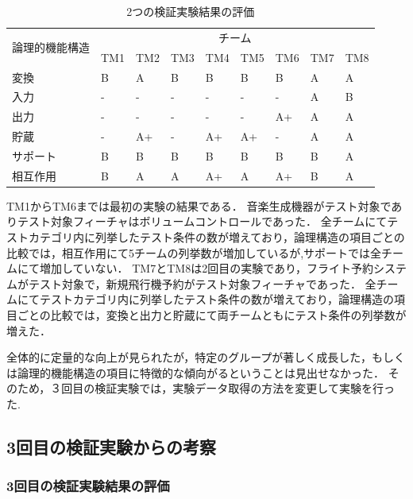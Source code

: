 \documentclass[10pt,a4j]{jarticle}
\begin{document}
\begin{table}[htbp]
\footnotesize
  \centering
  \caption{2つの検証実験結果の評価}
    \begin{tabular}{|l|l|l|l|l|l|l|l|l|}
    \hline
    \multicolumn{1}{|c|}{\multirow{2}[4]{*}{論理的機能構造}} & \multicolumn{8}{c|}{チーム} \bigstrut\\
\cline{2-9}          & TM1   & TM2   & TM3   & TM4   & TM5   & TM6 & TM7 & TM8 \bigstrut\\
    \hline
    変換  & B     & A     & B     & B     & B     & B & A     & A\bigstrut\\
    \hline
    入力 &  -     &   -     &   -    &   -    &   -    & -     & A     & B   \bigstrut\\
    \hline
    出力 & -     & -     & -     & -     & -     & A+ & A     & A \bigstrut\\
    \hline
    貯蔵 & -     & A+    & -     & A+    & A+    & -& A     & A  \bigstrut\\
    \hline
    サポート & B     & B     & B     & B     & B     & B& B     & A \bigstrut[t]\\
    \hline
    相互作用  & B     & A     & A     & A+    & A     & A+& B     & A \bigstrut[b]\\
    \hline
    \end{tabular}%
  \label{tbl:D-3-tbl5}%
\end{table}%

TM1からTM6までは最初の実験の結果である．
音楽生成機器がテスト対象でありテスト対象フィーチャはボリュームコントロールであった．
全チームにてテストカテゴリ内に列挙したテスト条件の数が増えており，論理構造の項目ごとの比較では，相互作用にて5チームの列挙数が増加しているが,サポートでは全チームにて増加していない．
TM7とTM8は2回目の実験であり，フライト予約システムがテスト対象で，新規飛行機予約がテスト対象フィーチャであった．
全チームにてテストカテゴリ内に列挙したテスト条件の数が増えており，論理構造の項目ごとの比較では，変換と出力と貯蔵にて両チームともにテスト条件の列挙数が増えた．

全体的に定量的な向上が見られたが，特定のグループが著しく成長した，もしくは論理的機能構造の項目に特徴的な傾向がるということは見出せなかった．
そのため，３回目の検証実験では，実験データ取得の方法を変更して実験を行った.

\subsection{3回目の検証実験からの考察}
\subsubsection{3回目の検証実験結果の評価} \label{sec:3-2}
\end{document}
